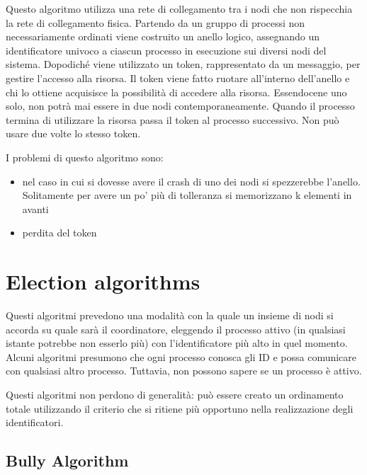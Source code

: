 Questo algoritmo utilizza una rete di collegamento tra i nodi che non rispecchia la rete di collegamento fisica. Partendo da un gruppo di processi non necessariamente ordinati viene costruito un anello logico, assegnando un identificatore univoco a ciascun processo in esecuzione sui diversi nodi del sistema. Dopodiché viene utilizzato un token, rappresentato da un messaggio, per gestire l'accesso alla risorsa. Il token viene fatto ruotare all'interno dell'anello e chi lo ottiene acquisisce la possibilità di accedere alla risorsa. Essendocene uno solo, non potrà mai essere in due nodi contemporaneamente. Quando il processo termina di utilizzare la risorsa passa il token al processo successivo. Non può usare due volte lo stesso token.

I problemi di questo algoritmo sono:
\begin{itemize}
    \item nel caso in cui si dovesse avere il crash di uno dei nodi si spezzerebbe l'anello. Solitamente per avere un po' più di tolleranza si memorizzano k elementi in avanti
    \item perdita del token
\end{itemize}


\section{Election algorithms}

Questi algoritmi prevedono una modalità con la quale un insieme di nodi si accorda su quale sarà il coordinatore, eleggendo il processo attivo (in qualsiasi istante potrebbe non esserlo più) con l'identificatore più alto in quel momento. Alcuni algoritmi presumono che ogni processo conosca gli ID e possa comunicare con qualsiasi altro processo. Tuttavia, non possono sapere se un processo è attivo. 

Questi algoritmi non perdono di generalità: può essere creato un ordinamento totale utilizzando il criterio che si ritiene più opportuno nella realizzazione degli identificatori.

\subsection{Bully Algorithm}

